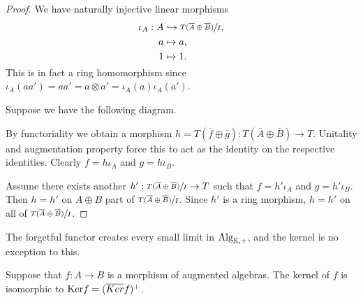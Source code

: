 \documentclass[../thesis.tex]{subfiles}
\begin{document}
                \begin{proof}
                    We have naturally injective linear morphisms
                    \begin{align*}
                        \iota_A : A & \hookrightarrow \sfrac{T(\overline{A}\oplus \overline{B})}{I}\tt{,} \\ 
                        a & \mapsto a\tt{,} \\
                        1 & \mapsto 1\tt{.}
                    \end{align*}
                    This is in fact a ring homomorphism since $\iota_A(aa') = aa' = a\otimes a' = \iota_A(a)\iota_A(a')$.

                    Suppose we have the following diagram.
                    \begin{center}
                    \end{center}
                    By functoriality we obtain a morphism $h = T(\overline{f}\oplus \overline{g}) : T(\overline{A} \oplus \overline{B}) \rightarrow T$. Unitality and augmentation property force this to act as the identity on the respective identities. Clearly $f = h \iota_A$ and $g = h \iota_B$.

                    Assume there exists another $h' : \sfrac{T(\overline{A}\oplus \overline{B})}{I} \rightarrow T$ such that $f = h' \iota_A$ and $g = h' \iota_B$. Then $h = h'$ on $A \oplus B$ part of $\sfrac{T(\overline{A}\oplus \overline{B})}{I}$. Since $h'$ is a ring morphism, $h = h'$ on all of $\sfrac{T(\overline{A}\oplus \overline{B})}{I}$.
                \end{proof}

                The forgetful functor creates every small limit in $\tt{Alg}_{\mathbb{K},+}$, and the kernel is no exception to this.

                \begin{lemma}
                    Suppose that $f: A \rightarrow B$ is a morphism of augmented algebras. The kernel of $f$ is isomorphic to $\tt{Ker}f = (\overline{Ker}f)^+$.
                \end{lemma}
\end{document}
